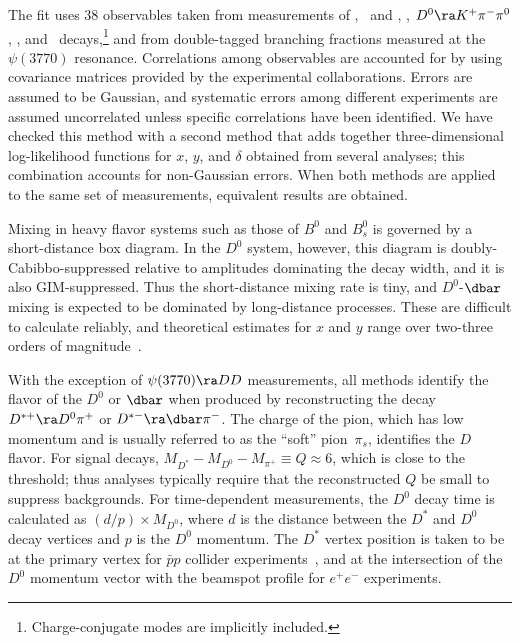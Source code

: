The fit uses 38 observables taken from 
measurements of \dklnu, \dkk\ and \dpipi, \dkpi, 
$D^0\ra K^+\pi^-\pi^0$, %
\dkspp, and \dkskk\ decays,\footnote{Charge-conjugate modes
are implicitly included.} and from double-tagged branching 
fractions measured at the $\psi(3770)$ resonance. Correlations 
among observables are accounted for by using covariance matrices 
provided by the experimental collaborations. Errors are assumed
to be Gaussian, and systematic errors among different experiments 
are assumed uncorrelated unless specific correlations have been 
identified.
We have checked this method with a second method that adds
together three-dimensional log-likelihood functions 
for $x$, $y$, and $\delta$ obtained from several analyses;
this combination accounts for non-Gaussian errors.
When both methods are applied to the same set of 
measurements, equivalent results are obtained. 


Mixing in heavy flavor systems such as those of $B^0$ and $B^0_s$ 
is governed by a short-distance box diagram. In the $D^0$ system,
however, this diagram is doubly-Cabibbo-suppressed relative to 
amplitudes dominating the decay width, and it is also GIM-suppressed.
Thus the short-distance mixing rate is tiny, and $D^0$-$\dbar$ 
mixing is expected to be dominated by long-distance processes. 
These are difficult to calculate reliably, and theoretical estimates 
for $x$ and $y$ range over two-three orders of 
magnitude~\cite{Bigi:2000wn,Petrov:2003un,Petrov:2004rf,Falk:2004wg}.


With the exception of $\psi(3770)\ra DD$ measurements, all methods 
identify the flavor of the $D^0$ or $\dbar$ when produced by 
reconstructing the decay $D^{*+}\ra D^0\pi^+$ or $D^{*-}\ra\dbar\pi^-$. 
The charge of the pion, which has low momentum and is usually 
referred to as the ``soft'' pion~$\pi^{}_s$,
identifies the $D$ flavor. For signal 
decays, $M^{}_{D^*}-M^{}_{D^0}-M^{}_{\pi^+}\equiv Q\approx 6$\meve, 
which is close to the threshold; thus analyses typically
require that the reconstructed $Q$ be small to suppress backgrounds. 
For time-dependent measurements, the $D^0$ decay time is 
calculated as $(d/p)\times M^{}_{D^0}$, where $d$ is
the distance between the $D^*$ and $D^0$ decay vertices and 
$p$ is the $D^0$ momentum. The $D^*$ vertex position is 
taken to be at the primary vertex for $\bar{p}p$ collider 
experiments~\cite{Aaltonen:2007uc}, and at the intersection 
of the $D^0$ momentum vector with the beamspot profile for 
$e^+e^-$ experiments.


